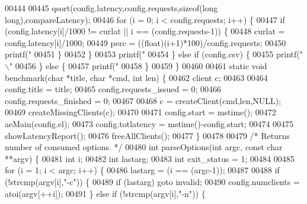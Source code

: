 \begin{DoxyCode}
{{{{{{{{{{{{{00444 
00445         qsort(config.latency,config.requests,\textcolor{keyword}{sizeof}(\textcolor{keywordtype}{long} \textcolor{keywordtype}{long}),compareLatency);
00446         \textcolor{keywordflow}{for} (i = 0; i < config.requests; i++) \{
00447             \textcolor{keywordflow}{if} (config.latency[i]/1000 != curlat || i == (config.requests-1)) \{
00448                 curlat = config.latency[i]/1000;
00449                 perc = ((\textcolor{keywordtype}{float})(i+1)*100)/config.requests;
00450                 printf(\textcolor{stringliteral}{"%
00451             \}
00452         \}
00453         printf(\textcolor{stringliteral}{"%
00454     \} \textcolor{keywordflow}{else} \textcolor{keywordflow}{if} (config.csv) \{
00455         printf(\textcolor{stringliteral}{"\(\backslash\)"%
00456     \} \textcolor{keywordflow}{else} \{
00457         printf(\textcolor{stringliteral}{"%
00458     \}
00459 \}
00460 
00461 \textcolor{keyword}{static} \textcolor{keywordtype}{void} benchmark(\textcolor{keywordtype}{char} *title, \textcolor{keywordtype}{char} *cmd, \textcolor{keywordtype}{int} len) \{
00462     client c;
00463 
00464     config.title = title;
00465     config.requests\_issued = 0;
00466     config.requests\_finished = 0;
00467 
00468     c = createClient(cmd,len,NULL);
00469     createMissingClients(c);
00470 
00471     config.start = mstime();
00472     aeMain(config.el);
00473     config.totlatency = mstime()-config.start;
00474 
00475     showLatencyReport();
00476     freeAllClients();
00477 \}
00478 
00479 \textcolor{comment}{/* Returns number of consumed options. */}
00480 \textcolor{keywordtype}{int} parseOptions(\textcolor{keywordtype}{int} argc, \textcolor{keyword}{const} \textcolor{keywordtype}{char} **argv) \{
00481     \textcolor{keywordtype}{int} i;
00482     \textcolor{keywordtype}{int} lastarg;
00483     \textcolor{keywordtype}{int} exit\_status = 1;
00484 
00485     \textcolor{keywordflow}{for} (i = 1; i < argc; i++) \{
00486         lastarg = (i == (argc-1));
00487 
00488         \textcolor{keywordflow}{if} (!strcmp(argv[i],\textcolor{stringliteral}{"-c"})) \{
00489             \textcolor{keywordflow}{if} (lastarg) \textcolor{keywordflow}{goto} invalid;
00490             config.numclients = atoi(argv[++i]);
00491         \} \textcolor{keywordflow}{else} \textcolor{keywordflow}{if} (!strcmp(argv[i],\textcolor{stringliteral}{"-n"})) \{
}}}}}}}}}}}}}}}}}
\end{DoxyCode}
